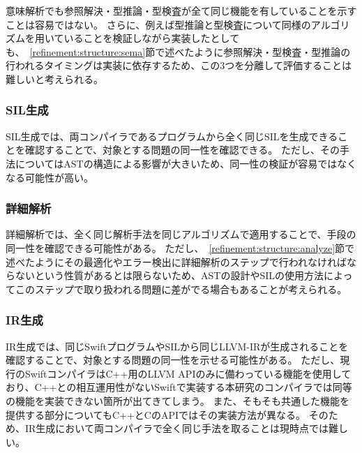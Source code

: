 意味解析でも参照解決・型推論・型検査が全て同じ機能を有していることを示すことは容易ではない。
さらに、例えば型推論と型検査について同様のアルゴリズムを用いていることを検証しながら実装したとしても、~\ref{refinement:structure:sema}節で述べたように参照解決・型検査・型推論の行われるタイミングは実装に依存するため、この3つを分離して評価することは難しいと考えられる。

\subsubsection{SIL生成}

SIL生成では、両コンパイラであるプログラムから全く同じSILを生成できることを確認することで、対象とする問題の同一性を確認できる。
ただし、その手法についてはASTの構造による影響が大きいため、同一性の検証が容易ではなくなる可能性が高い。

\subsubsection{詳細解析}

詳細解析では、全く同じ解析手法を同じアルゴリズムで適用することで、手段の同一性を確認できる可能性がある。
ただし、~\ref{refinement:structure:analyze}節で述べたようにその最適化やエラー検出に詳細解析のステップで行われなければならないという性質があるとは限らないため、ASTの設計やSILの使用方法によってこのステップで取り扱われる問題に差がでる場合もあることが考えられる。

\subsubsection{IR生成}

IR生成では、同じSwiftプログラムやSILから同じLLVM-IRが生成されることを確認することで、対象とする問題の同一性を示せる可能性がある。
ただし、現行のSwiftコンパイラはC++用のLLVM APIのみに備わっている機能を使用しており、C++との相互運用性がないSwiftで実装する本研究のコンパイラでは同等の機能を実装できない箇所が出てきてしまう。
また、そもそも共通した機能を提供する部分についてもC++とCのAPIではその実装方法が異なる。
そのため、IR生成において両コンパイラで全く同じ手法を取ることは現時点では難しい。
